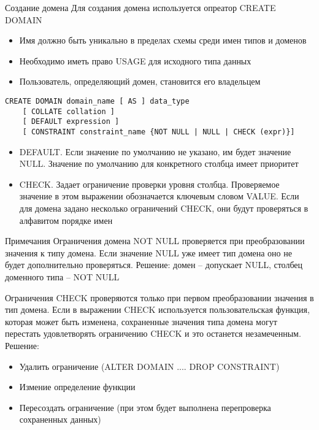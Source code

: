 \documentclass[12pt]{article}
\begin{document}
\begin{nota}{Создание домена}
    Для создания домена используется опреатор CREATE DOMAIN

    \begin{itemize}
        \item Имя должно быть уникально в пределах схемы среди имен типов и доменов 
        \item Необходимо иметь право USAGE для исходного типа данных 
        \item Пользователь, определяющий домен, становится его владельцем 
    \end{itemize}

\begin{lstlisting}
CREATE DOMAIN domain_name [ AS ] data_type
    [ COLLATE collation ]
    [ DEFAULT expression ]
    [ CONSTRAINT constraint_name {NOT NULL | NULL | CHECK (expr)}]
\end{lstlisting}

    \begin{itemize}
        \item DEFAULT. Если значение по умолчанию не указано, им будет значение NULL. Значение по умолчанию для конкретного столбца имеет приоритет 
        \item CHECK. Задает ограничение проверки уровня столбца. Проверяемое значение в этом выражении обозначается ключевым словом VALUE. Если для домена задано несколько ограничений CHECK, они будут проверяться в алфавитом порядке имен 
    \end{itemize}
\end{nota}

\begin{Remark}{Примечания}
    Ограничения домена NOT NULL проверяется при преобразовании значения к типу домена. Если значение NULL уже имеет тип домена оно не будет дополнительно проверяться. Решение: домен -- допускает NULL, столбец доменного типа -- NOT NULL

    Ограничения CHECK проверяются только при первом преобразовании значения в тип домена. Если в выражении CHECK используется пользовательская функция, которая может быть изменена, сохраненные значения типа домена могут перестать удовлетворять ограничению CHECK и это останется незамеченным. Решение:

    \begin{itemize}
        \item Удалить ограничение (ALTER DOMAIN .... DROP CONSTRAINT)
        \item Измение определение функции 
        \item Пересоздать ограничение (при этом будет выполнена перепроверка сохраненных данных)
    \end{itemize}
\end{Remark}
\end{document}
